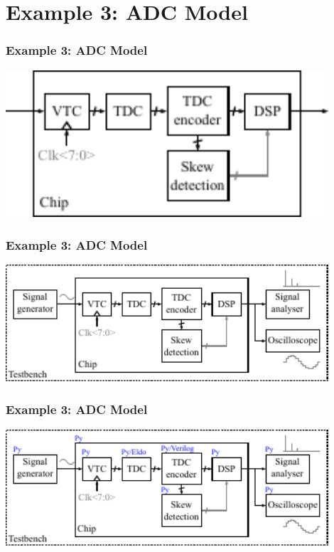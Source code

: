 \documentclass[logo=bluequo,normaltitle]{aaltoslides}
\newcommand{\sectname}{Section Name}
\begin{document}
\renewcommand{\sectname}{Example 3: ADC Model}
\section{\sectname} 
\begin{frame}[c]
    \frametitle{\sectname}
    \centering
    \includegraphics[width=0.9\textwidth]{Pics/sdk_model_0}
\end{frame}
\begin{frame}[c]
    \frametitle{\sectname}
    \centering
    \includegraphics[width=0.9\textwidth]{Pics/sdk_model_1}
\end{frame}

\begin{frame}[c]
    \frametitle{\sectname}
    \centering
    \includegraphics[width=0.9\textwidth]{Pics/sdk_model_2}
\end{frame}
\end{document}
